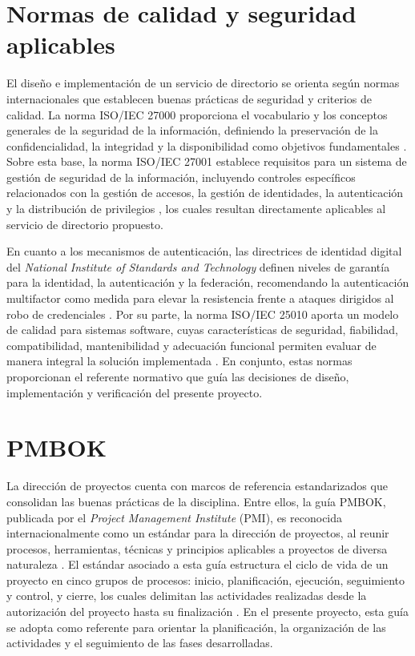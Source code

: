 \section{Normas de calidad y seguridad aplicables}

El diseño e implementación de un servicio de directorio se orienta según normas internacionales que establecen buenas prácticas de seguridad y criterios de calidad. La norma ISO/IEC 27000 proporciona el vocabulario y los conceptos generales de la seguridad de la información, definiendo la preservación de la confidencialidad, la integridad y la disponibilidad como objetivos fundamentales \citep{ISO27000}. Sobre esta base, la norma ISO/IEC 27001 establece requisitos para un sistema de gestión de seguridad de la información, incluyendo controles específicos relacionados con la gestión de accesos, la gestión de identidades, la autenticación y la distribución de privilegios \citep{ISO27001}, los cuales resultan directamente aplicables al servicio de directorio propuesto.

En cuanto a los mecanismos de autenticación, las directrices de identidad digital del \textit{National Institute of Standards and Technology} definen niveles de garantía para la identidad, la autenticación y la federación, recomendando la autenticación multifactor como medida para elevar la resistencia frente a ataques dirigidos al robo de credenciales \citep{NIST80063v4}. Por su parte, la norma ISO/IEC 25010 aporta un modelo de calidad para sistemas software, cuyas características de seguridad, fiabilidad, compatibilidad, mantenibilidad y adecuación funcional permiten evaluar de manera integral la solución implementada \citep{ISO25010}. En conjunto, estas normas proporcionan el referente normativo que guía las decisiones de diseño, implementación y verificación del presente proyecto.

\section{\texorpdfstring{\acs{PMBOK}}{PMBOK}}

La dirección de proyectos cuenta con marcos de referencia estandarizados que consolidan las buenas prácticas de la disciplina. Entre ellos, la guía \acs{PMBOK}, publicada por el \textit{Project Management Institute} (\acs{PMI}), es reconocida internacionalmente como un estándar para la dirección de proyectos, al reunir procesos, herramientas, técnicas y principios aplicables a proyectos de diversa naturaleza \citep{PMI2021}. El estándar asociado a esta guía estructura el ciclo de vida de un proyecto en cinco grupos de procesos: inicio, planificación, ejecución, seguimiento y control, y cierre, los cuales delimitan las actividades realizadas desde la autorización del proyecto hasta su finalización \citep{PMI2021}. En el presente proyecto, esta guía se adopta como referente para orientar la planificación, la organización de las actividades y el seguimiento de las fases desarrolladas.
